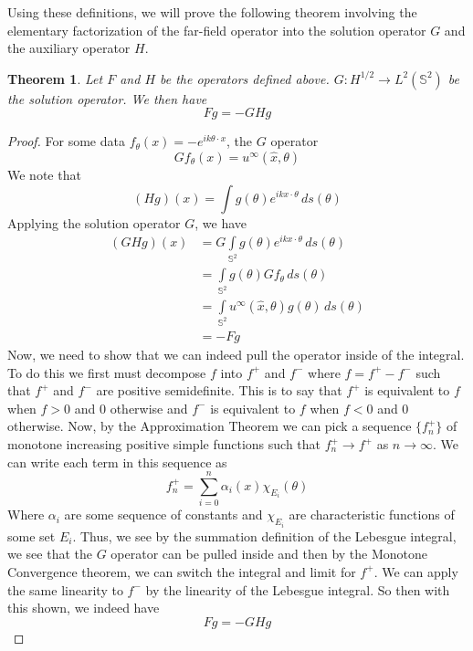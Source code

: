 \documentclass[]{article}
\newtheorem{theorem}{Theorem}
\begin{document}
			Using these definitions, we will prove the following theorem involving the elementary factorization of the far-field operator into the solution operator $G$ and the auxiliary operator $H$.
			\begin{theorem}
				Let $F$ and $H$ be the operators defined above. $G: H^{1/2} \to L^2(\mathbb S^2)$ be the solution operator. We then have 
				\begin{equation}
					Fg = -GHg
				\end{equation}
			\end{theorem}
			\begin{proof}
				For some data $f_\theta(x)= -e^{ik\theta \cdot x}$, the $G$ operator
				\begin{equation}
					Gf_\theta(x) = u^\infty(\hat x, \theta) 
				\end{equation}
				We note that 
				\begin{equation}
					(Hg)(x) = \int g(\theta)e^{ikx\cdot \theta}\, ds(\theta)
				\end{equation}
				Applying the solution operator $G$, we have 
				\begin{align}
					(GHg)(x) &= G\int\limits_{\mathbb S^2} g(\theta)e^{ikx\cdot \theta}\,ds(\theta)\\
					&= \int\limits_{\mathbb S^2} g(\theta)Gf_\theta\, ds(\theta)\\
					&=  \int\limits_{\mathbb S^2}u^\infty(\hat x, \theta)g(\theta)\, ds(\theta)\\
					&= -Fg
				\end{align}
				Now, we need to show that we can indeed pull the operator inside of the integral. To do this we first must decompose $f$ into $f^+$ and $f^-$ where $f = f^+-f^-$ such that $f^+$ and $f^-$ are positive semidefinite. This is to say that $f^+$ is equivalent to $f$ when $f>0$ and 0 otherwise and $f^-$ is equivalent to $f$ when $f<0$ and 0 otherwise. Now, by the Approximation Theorem we can pick a sequence $\{f^+_{n}\}$ of monotone increasing positive simple functions such that $f^+_{n}\to f^+$ as $n \to \infty$. We can write each term in this sequence as 
				\begin{equation}
					f^+_{n} = \sum^n_{i=0}\alpha_i(x)\chi_{E_i}(\theta)
				\end{equation} 
				Where $\alpha_i$ are some sequence of constants and $\chi_{E_i}$ are characteristic functions of some set $E_i$. Thus, we see by the summation definition of the Lebesgue integral, we see that the $G$ operator can be pulled inside and then by the Monotone Convergence theorem, we can switch the integral and limit for $f^+$. We can apply the same linearity to $f^-$ by the linearity of the Lebesgue integral. So then with this shown, we indeed have 
				\begin{equation}
					Fg = -GHg
				\end{equation}
			\end{proof}
\end{document}
